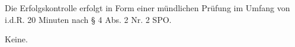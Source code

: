 \begin{course}

\setdoclanguagegerman
{}



\coursehead


\label{cour_8137.dp_997}


\begin{styleenv}
\begin{assessment}
Die Erfolgskontrolle erfolgt in Form einer mündlichen Prüfung im Umfang von i.d.R. 20 Minuten nach § 4 Abs. 2 Nr. 2 SPO.


\end{assessment}

\begin{conditions}Keine.\end{conditions}


\end{styleenv}

\begin{learningoutcomes}

\end{learningoutcomes}


\end{course}
